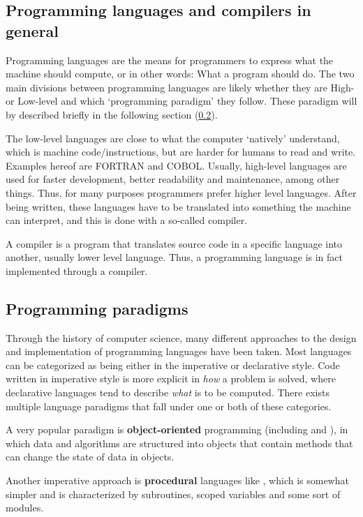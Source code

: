
\subsection{Programming languages and compilers in general}
Programming languages are the means for programmers to express what the machine should compute, or in other words: What a program should do.
The two main divisions between programming languages are likely whether they are High- or Low-level and which `programming paradigm' they follow. These paradigm will by described briefly in the following section (\ref{sec:paradigms}).

The low-level languages are close to what the computer `natively' understand, which is machine code/instructions, but are harder for humans to read and write. Examples hereof are FORTRAN and COBOL. Usually, high-level languages are used for faster development, better readability and maintenance, among other things. Thus, for many purposes programmers prefer higher level languages. After being written, these languages have to be translated into something the machine can interpret, and this is done with a so-called compiler.

A compiler is a program that translates source code in a specific language into another, usually lower level language. Thus, a programming language is in fact implemented through a compiler.


\subsection{Programming paradigms}
\label{sec:paradigms}
Through the history of computer science, many different approaches to the design and implementation of programming languages have been taken. Most languages can be categorized as being either in the imperative or declarative style. Code written in imperative style is more explicit in \emph{how} a problem is solved, where declarative languages tend to describe \emph{what} is to be computed. There exists multiple language paradigms that fall under one or both of these categories.

A very popular paradigm is \textbf{object-oriented} programming (including  and ), in which data and algorithms are structured into objects that contain methods that can change the state of data in objects.

Another imperative approach is \textbf{procedural} languages like , which is somewhat simpler and is characterized by subroutines, scoped variables and some sort of modules.

